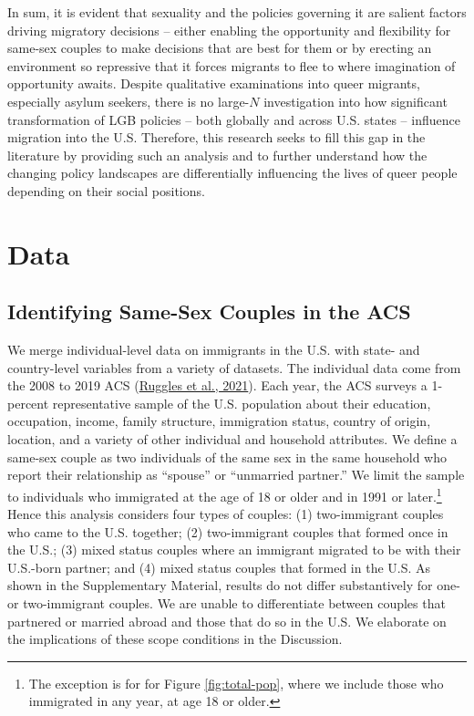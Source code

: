 \documentclass[
  11pt,
]{article}
\begin{document}
In sum, it is evident that sexuality and the policies governing it are salient factors driving migratory decisions -- either enabling the opportunity and flexibility for same-sex couples to make decisions that are best for them or by erecting an environment so repressive that it forces migrants to flee to where imagination of opportunity awaits. Despite qualitative examinations into queer migrants, especially asylum seekers, there is no large-\(N\) investigation into how significant transformation of LGB policies -- both globally and across U.S. states -- influence migration into the U.S. Therefore, this research seeks to fill this gap in the literature by providing such an analysis and to further understand how the changing policy landscapes are differentially influencing the lives of queer people depending on their social positions.

\hypertarget{data}{%
\section{Data}\label{data}}

\hypertarget{identifying-same-sex-couples-in-the-acs}{%
\subsection{Identifying Same-Sex Couples in the ACS}\label{identifying-same-sex-couples-in-the-acs}}

We merge individual-level data on immigrants in the U.S. with state- and country-level variables from a variety of datasets. The individual data come from the 2008 to 2019 ACS (\protect\hyperlink{ref-ruggles_2021}{Ruggles et al., 2021}). Each year, the ACS surveys a 1-percent representative sample of the U.S. population about their education, occupation, income, family structure, immigration status, country of origin, location, and a variety of other individual and household attributes. We define a same-sex couple as two individuals of the same sex in the same household who report their relationship as ``spouse'' or ``unmarried partner.'' We limit the sample to individuals who immigrated at the age of 18 or older and in 1991 or later.\footnote{The exception is for for Figure \ref{fig:total-pop}, where we include those who immigrated in any year, at age 18 or older.} Hence this analysis considers four types of couples: (1) two-immigrant couples who came to the U.S. together; (2) two-immigrant couples that formed once in the U.S.; (3) mixed status couples where an immigrant migrated to be with their U.S.-born partner; and (4) mixed status couples that formed in the U.S. As shown in the Supplementary Material, results do not differ substantively for one- or two-immigrant couples. We are unable to differentiate between couples that partnered or married abroad and those that do so in the U.S. We elaborate on the implications of these scope conditions in the Discussion.
\end{document}
